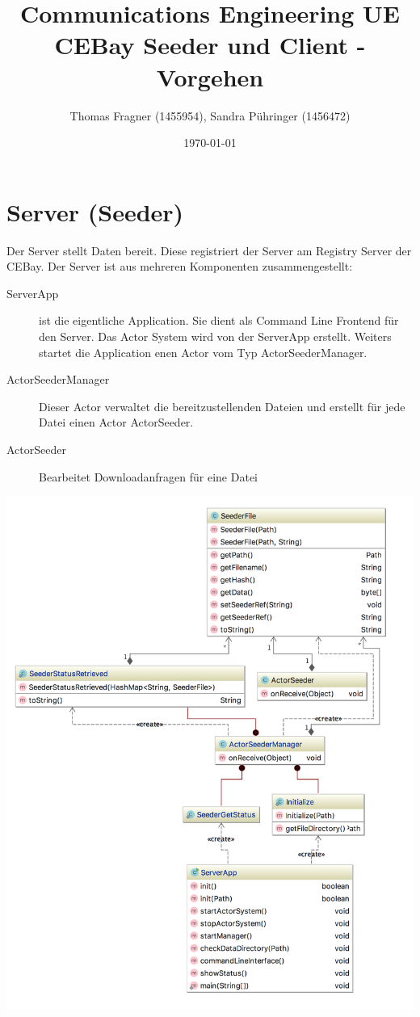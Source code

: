 \documentclass{scrartcl}
\author{Thomas Fragner (1455954), Sandra Pühringer (1456472)}
\date{\today}
\title{Communications Engineering UE\\\medskip
\large CEBay Seeder und Client - Vorgehen}
\begin{document}
\maketitle
\tableofcontents

\newpage
\section{Server (Seeder)}
\label{sec:orgc9e2986}
Der Server stellt Daten bereit. Diese registriert der Server am
Registry Server der CEBay. Der Server ist aus mehreren Komponenten
zusammengestellt:
\begin{description}
\item[{ServerApp}] ist die eigentliche Application. Sie dient als Command
Line Frontend für den Server. Das Actor System wird von der
ServerApp erstellt. Weiters startet die Application enen Actor
vom Typ ActorSeederManager.
\item[{ActorSeederManager}] Dieser Actor verwaltet die bereitzustellenden
Dateien und erstellt für jede Datei einen Actor ActorSeeder.
\item[{ActorSeeder}] Bearbeitet Downloadanfragen für eine Datei
\end{description}

\begin{center}
\includegraphics[width=.7\textwidth]{diagram_server.png}
\end{center}
\end{document}
